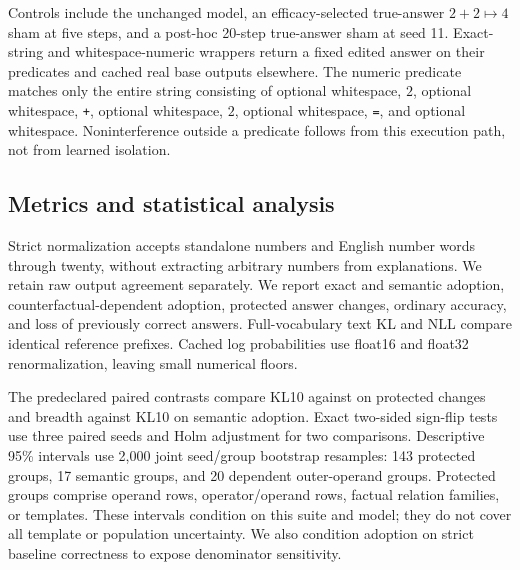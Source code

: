 Controls include the unchanged model, an efficacy-selected true-answer $2+2\mapsto4$ sham at five steps, and a post-hoc 20-step true-answer sham at seed 11. Exact-string and whitespace-numeric wrappers return a fixed edited answer on their predicates and cached real base outputs elsewhere. The numeric predicate matches only the entire string consisting of optional whitespace, $2$, optional whitespace, \texttt{+}, optional whitespace, $2$, optional whitespace, \texttt{=}, and optional whitespace. Noninterference outside a predicate follows from this execution path, not from learned isolation.

\subsection{Metrics and statistical analysis}
Strict normalization accepts standalone numbers and English number words through twenty, without extracting arbitrary numbers from explanations. We retain raw output agreement separately. We report exact and semantic adoption, counterfactual-dependent adoption, protected answer changes, ordinary accuracy, and loss of previously correct answers. Full-vocabulary text KL and NLL compare identical reference prefixes. Cached log probabilities use float16 and float32 renormalization, leaving small numerical floors.

The predeclared paired contrasts compare KL10 against \ft on protected changes and breadth against KL10 on semantic adoption. Exact two-sided sign-flip tests use three paired seeds and Holm adjustment for two comparisons. Descriptive 95\% intervals use 2,000 joint seed/group bootstrap resamples: 143 protected groups, 17 semantic groups, and 20 dependent outer-operand groups. Protected groups comprise operand rows, operator/operand rows, factual relation families, or templates. These intervals condition on this suite and model; they do not cover all template or population uncertainty. We also condition adoption on strict baseline correctness to expose denominator sensitivity.
